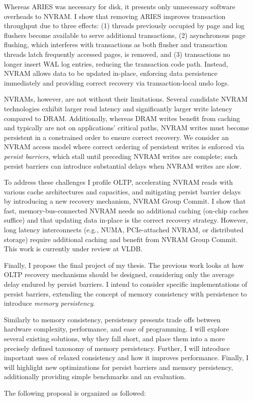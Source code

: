 Whereas ARIES was necessary for disk, it presents only unnecessary software overheads to NVRAM.
I show that removing ARIES improves transaction throughput due to three effects: (1) threads previously occupied by page and log flushers become available to serve additional transactions, (2) asynchronous page flushing, which interferes with transactions as both flusher and transaction threads latch frequently accessed pages, is removed, and (3) transactions no longer insert WAL log entries, reducing the transaction code path.
Instead, NVRAM allows data to be updated in-place, enforcing data persistence immediately and providing correct recovery via transaction-local undo logs.

NVRAMs, however, are not without their limitations.
Se\-veral candidate NVRAM technologies exhibit larger read latency and significantly larger write latency compared to DRAM.
Additionally, whereas DRAM writes benefit from caching and typically are not on applications' critical paths, NVRAM writes must become persistent in a constrained order to ensure correct recovery.
We consider an NVRAM access model where correct ordering of persistent writes is enforced via \emph{persist barriers}, which stall until preceding NVRAM writes are complete; such persist barriers can introduce substantial delays when NVRAM writes are slow.

To address these challenges I profile OLTP, accelerating NVRAM reads with various cache architectures and capacities, and mitigating persist barrier delays by introducing a new recovery mechanism, NVRAM Group Commit.
I show that fast, memory-bus-connected NVRAM needs no additional caching (on-chip caches suffice) and that updating data in-place is the correct recovery strategy.
However, long latency interconnects (e.g., NUMA, PCIe-attached NVRAM, or distributed storage) require additional caching and benefit from NVRAM Group Commit.
This work is currently under review at VLDB.

Finally, I propose the final project of my thesis.
The previous work looks at how OLTP recovery mechanisms should be designed, considering only the average delay endured by persist barriers.
I intend to consider specific implementations of persist barriers, extending the concept of memory consistency with persistence to introduce \emph{memory persistency}.

Similarly to memory consistency, persistency presents trade offs between hardware complexity, performance, and ease of programming.
I will explore several existing solutions, why they fall short, and place them into a more precisely defined taxonomy of memory persistency.
Further, I will introduce important uses of relaxed consistency and how it improves performance.
Finally, I will highlight new optimizations for persist barriers and memory persistency, additionally providing simple benchmarks and an evaluation.

The following proposal is organized as followed:
